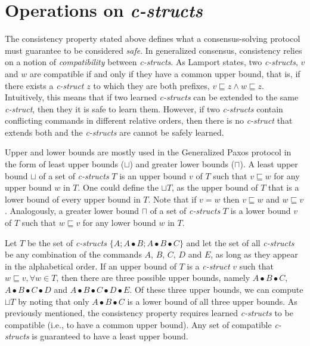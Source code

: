 \section{Operations on \textit{c-structs}} \label{Operations}
The consistency property stated above defines what a consensus-solving protocol must guarantee to be considered \textit{safe}. In generalized consensus, consistency relies on a notion of \textit{compatibility} between \textit{c-structs}. As Lamport states, two \textit{c-structs}, $v$ and $w$ are compatible if and only if they have a common upper bound, that is, if there exists a \textit{c-struct} $z$ to which they are both prefixes, $v \sqsubseteq z \land w \sqsubseteq z$. Intuitively, this means that if two learned \textit{c-structs} can be extended to the same \textit{c-struct}, then they it is safe to learn them. However, if two \textit{c-structs} contain conflicting commands in different relative orders, then there is no \textit{c-struct} that extends both and the \textit{c-structs} are cannot be safely learned.\par
Upper and lower bounds are mostly used in the Generalized Paxos protocol in the form of least upper bounds ($\sqcup$) and greater lower bounds ($\sqcap$). A least upper bound $\sqcup$ of a set of \textit{c-structs} $T$  is an upper bound $v$ of $T$ such that $v \sqsubseteq w$ for any upper bound $w$ in $T$. One could define the $\sqcup T$, as the upper bound of $T$ that is a lower bound of every upper bound in $T$. Note that if $v = w$ then $v\sqsubseteq w$ and $w\sqsubseteq v$. Analogously, a greater lower bound $\sqcap$ of a set of \textit{c-structs} $T$ is a lower bound $v$ of $T$ such that $w \sqsubseteq v$ for any lower bound $w$ in $T$. \par
Let $T$ be the set of \textit{c-structs} $\{A ; A \bullet B ; A \bullet B \bullet C\}$ and let the set of all \textit{c-structs} be any combination of the commands $A$, $B$, $C$, $D$ and $E$, as long as they appear in the alphabetical order. If an upper bound of $T$ is a \textit{c-struct} $v$ such that $w \sqsubseteq v, \forall w \in T$, then there are three possible upper bounds, namely $A \bullet B \bullet C$, $A \bullet B \bullet C \bullet D$ and $A \bullet B \bullet C \bullet D \bullet E$. Of these three upper bounds, we can compute $\sqcup T$ by noting that only $A \bullet B \bullet C$ is a lower bound of all three upper bounds. As previously mentioned, the consistency property requires learned \textit{c-structs} to be compatible (i.e., to have a common upper bound). Any set of compatible \textit{c-structs} is guaranteed to have a least upper bound. \par 
